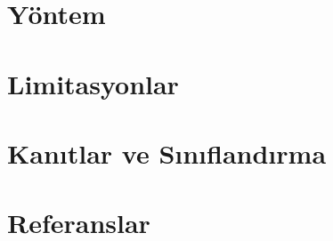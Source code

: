\documentclass{article}
\begin{document}

\section{Yöntem}

\section{Limitasyonlar}

\section{Kanıtlar ve Sınıflandırma}

\section{Referanslar}
\end{document}
